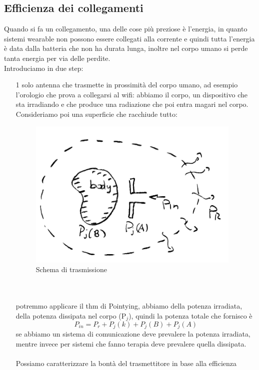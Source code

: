 \documentclass[oneside, 12pt]{extbook}
\begin{document}
\subsection{Efficienza dei collegamenti}
Quando si fa un collegamento, una delle cose più preziose è l'energia, in quanto sistemi wearable non possono essere collegati alla corrente e quindi tutta l'energia è data dalla batteria che non ha durata lunga, inoltre nel corpo umano si perde tanta energia per via delle perdite.\\Introduciamo in due step:
\begin{itemize}
	\item[1] solo antenna che trasmette in prossimità del corpo umano, ad esempio l'orologio che prova a collegarsi al wifi: abbiamo il corpo, un dispositivo che sta irradiando e che produce una radiazione che poi entra magari nel corpo.\\Consideriamo poi una superficie che racchiude tutto:
	\begin{figure}
		\includegraphics[scale=0.3]{immagini/eff_coll_1.png}
		\caption{Schema di trasmissione}
	\end{figure}\\\\
	potremmo applicare il thm di Pointying, abbiamo della potenza irradiata, della potenza dissipata nel corpo (P$_j$), quindi la potenza totale che fornisco è 
	\begin{equation}
		P_{in} = P_r + P_j(k) + P_j(B) + P_j(A)
	\end{equation}
	se abbiamo un sistema di comunicazione deve prevalere la potenza irradiata, mentre invece per sistemi che fanno terapia deve prevalere quella dissipata.\\\\Possiamo caratterizzare la bontà del trasmettitore in base alla efficienza 
	\begin{equation}

\end{equation}
\end{itemize}
\end{document}
